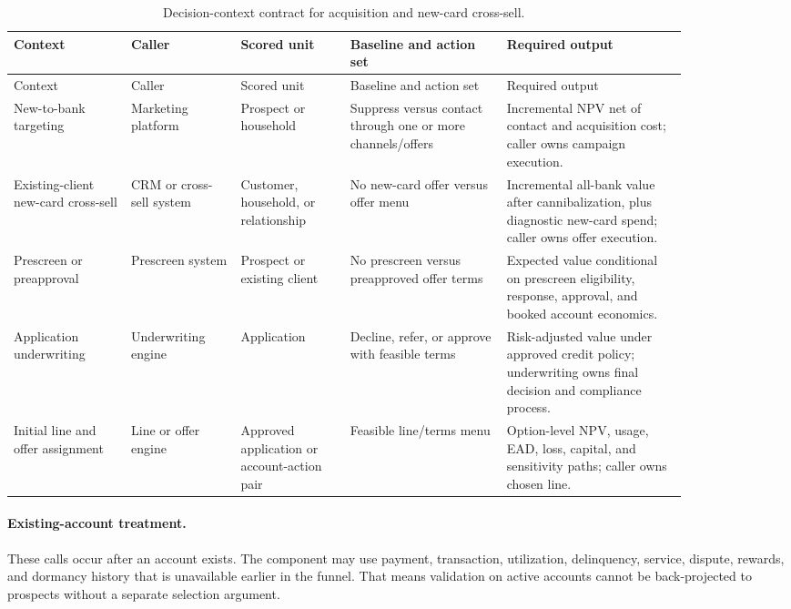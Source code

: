 \documentclass[11pt]{article}
\newcommand{\1}{\mathbf{1}}
\begin{document}
\begin{longtable}{L{0.15\linewidth}L{0.14\linewidth}L{0.14\linewidth}L{0.20\linewidth}L{0.23\linewidth}}
\caption{Decision-context contract for acquisition and new-card cross-sell.}
\label{tab:acq-contract}\\
\toprule
Context & Caller & Scored unit & Baseline and action set & Required output \\
\midrule
\endfirsthead
\toprule
Context & Caller & Scored unit & Baseline and action set & Required output \\
\midrule
\endhead
New-to-bank targeting
  & Marketing platform
  & Prospect or household
  & Suppress versus contact through one or more channels/offers
  & Incremental NPV net of contact and acquisition cost; caller owns campaign
    execution. \\
Existing-client new-card cross-sell
  & CRM or cross-sell system
  & Customer, household, or relationship
  & No new-card offer versus offer menu
  & Incremental all-bank value after cannibalization, plus diagnostic new-card
    spend; caller owns offer execution. \\
Prescreen or preapproval
  & Prescreen system
  & Prospect or existing client
  & No prescreen versus preapproved offer terms
  & Expected value conditional on prescreen eligibility, response, approval,
    and booked account economics. \\
Application underwriting
  & Underwriting engine
  & Application
  & Decline, refer, or approve with feasible terms
  & Risk-adjusted value under approved credit policy; underwriting owns final
    decision and compliance process. \\
Initial line and offer assignment
  & Line or offer engine
  & Approved application or account-action pair
  & Feasible line/terms menu
  & Option-level NPV, usage, EAD, loss, capital, and sensitivity paths; caller
    owns chosen line. \\
\bottomrule
\end{longtable}

\paragraph{Existing-account treatment.}
These calls occur after an account exists. The component may use payment,
transaction, utilization, delinquency, service, dispute, rewards, and dormancy
history that is unavailable earlier in the funnel. That means validation on
active accounts cannot be back-projected to prospects without a separate
selection argument.
\end{document}

